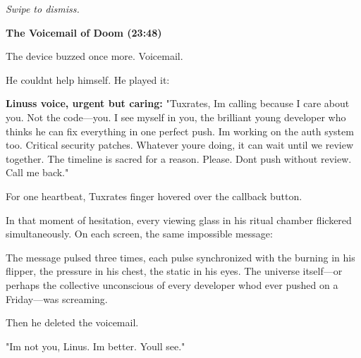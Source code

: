 \emph{Swipe to dismiss.}

\textbf{The Voicemail of Doom (23:48)}

The device buzzed once more. Voicemail.

He couldn\textquotesingle t help himself. He played it:

\textbf{Linus\textquotesingle s voice, urgent but caring:} "Tuxrates, I\textquotesingle m calling because I care about you. Not the code---you. I see myself in you, the brilliant young developer who thinks he can fix everything in one perfect push. I\textquotesingle m working on the auth system too. Critical security patches. Whatever you\textquotesingle re doing, it can wait until we review together. The timeline is sacred for a reason. Please. Don\textquotesingle t push without review. Call me back."

For one heartbeat, Tuxrates\textquotesingle{} finger hovered over the callback button.

In that moment of hesitation, every viewing glass in his ritual chamber flickered simultaneously. On each screen, the same impossible message:


The message pulsed three times, each pulse synchronized with the burning in his flipper, the pressure in his chest, the static in his eyes. The universe itself---or perhaps the collective unconscious of every developer who\textquotesingle d ever pushed on a Friday---was screaming.

Then he deleted the voicemail.

"I\textquotesingle m not you, Linus. I\textquotesingle m better. You\textquotesingle ll see."

